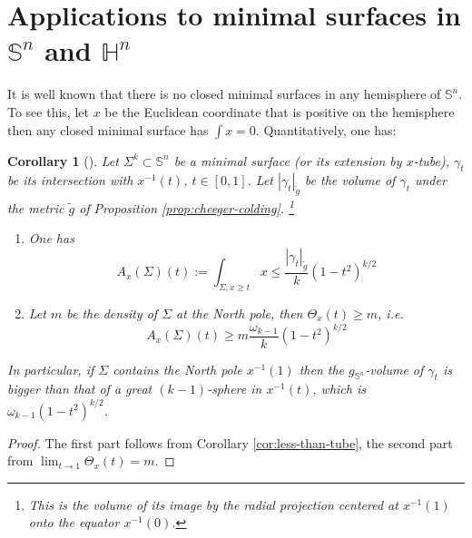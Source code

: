 \documentclass[11pt]{article}
\newtheorem{corollary}[theorem]{Corollary}
\begin{document}
\section{Applications to minimal surfaces in \(\mathbb{S}^n\) and \(\mathbb{H}^n\)}
\label{sec:orga09937d}
It is well known that there is no closed minimal surfaces in any hemisphere of \(\mathbb{S}^n\).  To see this, let \(x\) be the Euclidean coordinate that is positive on
the hemisphere then any closed minimal surface has \(\int x = 0\). 
Quantitatively, one has:
\begin{corollary}[]
\label{cor:sphere}
Let \(\Sigma^k \subset \mathbb{S}^n\) be a minimal surface (or its extension by \(x\)-tube), \(\gamma_t\) be its intersection with \(x^{-1}(t)\), \(t\in[0,1]\). Let
\(|\gamma_t|_{\tilde g}\) be the volume of \(\gamma_t\) under the metric \(\tilde g\) of Proposition \ref{prop:cheeger-colding}. \footnote{This is the volume of its
image by the radial projection centered at \(x^{-1}(1)\) onto the equator \(x^{-1}(0)\).} 
\begin{enumerate}
\item One has 
\begin{equation}
\label{eq:cor-sphere-1}
  A_x(\Sigma)(t):=\int_{\Sigma, x\geq t}x  \leq \frac{|\gamma_t|_{\tilde g}}{k} (1-t^2)^{k/2}
\end{equation}
\item Let \(m\) be the density of \(\Sigma\) at the North pole, then \(\Theta_x(t)\geq
   m\), i.e.
\begin{equation}
\label{eq:cor-sphere-2}
A_x(\Sigma)(t) \geq m\frac{\omega_{k-1}}{k}(1-t^2)^{k/2}   
\end{equation}
\end{enumerate}
In particular, if \(\Sigma\) contains the North pole \(x^{-1}(1)\) then the \(g_{\mathbb{S}^n}\)-volume of \(\gamma_t\) is bigger than that of a great \((k-1)\)-sphere in \(x^{-1}(t)\), which is \(\omega_{k-1}(1-t^2)^{k/2}\).
\end{corollary}
\begin{proof}
The first part follows from Corollary \ref{cor:less-than-tube}, the second part
from \(\lim_{t\to 1}\Theta_x(t) = m\).
\end{proof}
\end{document}
